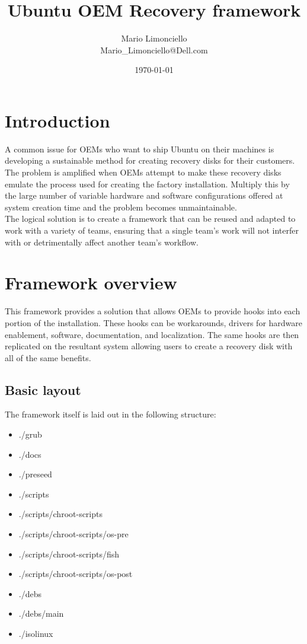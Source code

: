 \documentclass[letterpaper,10pt,titlepage]{article}
\title{\textbf{Ubuntu OEM Recovery framework}}
\author{Mario Limonciello\\ Mario\_Limonciello@Dell.com}
\date{\today}
\begin{document}
\maketitle

\tableofcontents
\newpage

\section{Introduction}
A common issue for OEMs who want to ship Ubuntu on their machines is developing a sustainable method for creating recovery disks for their customers.  The problem is amplified when OEMs attempt to make these recovery disks emulate the process used for creating the factory installation.  Multiply this by the large number of variable hardware and software configurations offered at system creation time and the problem becomes unmaintainable.
\\
The logical solution is to create a framework that can be reused and adapted to work with a variety of teams, ensuring that a single team's work will not interfer with or detrimentally affect another team's workflow.

\section{Framework overview}
This framework provides a solution that allows OEMs to provide hooks into each portion of the installation.  These hooks can be workarounds, drivers for hardware enablement, software, documentation, and localization.  The same hooks are then replicated on the resultant system allowing users to create a recovery disk with all of the same benefits.

\subsection{Basic layout}
The framework itself is laid out in the following structure:
\begin{itemize}
\item ./grub
\item ./docs
\item ./preseed
\item ./scripts
\item ./scripts/chroot-scripts
\item ./scripts/chroot-scripts/os-pre
\item ./scripts/chroot-scripts/fish
\item ./scripts/chroot-scripts/os-post
\item ./debs
\item ./debs/main
\item ./isolinux
\end{itemize}
\end{document}
